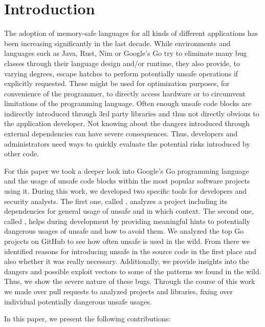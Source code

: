 \section{Introduction}
\label{sec:intro}


The adoption of memory-safe languages for all kinds of different applications has been increasing significantly in the last decade. 
While environments and languages such as Java, Rust, Nim or Google's Go try to eliminate many bug classes through their language design and/or runtime, they also provide, to varying degrees, escape hatches to perform potentially unsafe operations if explicitly requested.
These might be used for optimization purposes, for convenience of the programmer, to directly access hardware or to circumvent limitations of the programming language.
Often enough unsafe code blocks are indirectly introduced through 3rd party libraries \cite{evans2020} and thus not directly obvious to the application developer.
Not knowing about the dangers introduced through external dependencies can have severe consequences.
Thus, developers and administrators need ways to quickly evaluate the potential risks introduced by other code.

For this paper we took a deeper look into Google's Go programming language and the usage of unsafe code blocks within the most popular software projects using it. 
During this work, we developed two specific tools for developers and security analysts. The first one, called \toolUsage{}, analyzes a project including its dependencies for general usage of unsafe and in which context.
The second one, called \toolSA{}, helps during development by providing meaningful hints to potentially dangerous usages of unsafe and how to avoid them. 
We analyzed the top \projsAnalyzed{} Go projects on GitHub to see how often unsafe is used in the wild.  
From there we identified reasons for introducing unsafe in the source code in the first place and also whether it was really necessary.
Additionally, we provide insights into the dangers and possible exploit vectors to some of the patterns we found in the wild. 
Thus, we show the severe nature of these bugs.
Through the course of this work we made over  pull requests to analyzed projects and libraries, fixing over  individual potentially dangerous unsafe usages.

In this paper, we present the following contributions:

